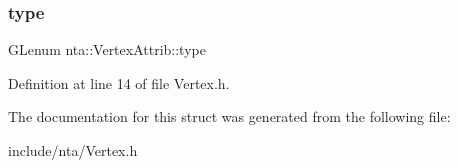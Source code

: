 \subsubsection{\texorpdfstring{type}{type}}
{\footnotesize\ttfamily G\+Lenum nta\+::\+Vertex\+Attrib\+::type}



Definition at line 14 of file Vertex.\+h.



The documentation for this struct was generated from the following file\+:\begin{DoxyCompactItemize}
\item 
include/nta/Vertex.\+h\end{DoxyCompactItemize}
